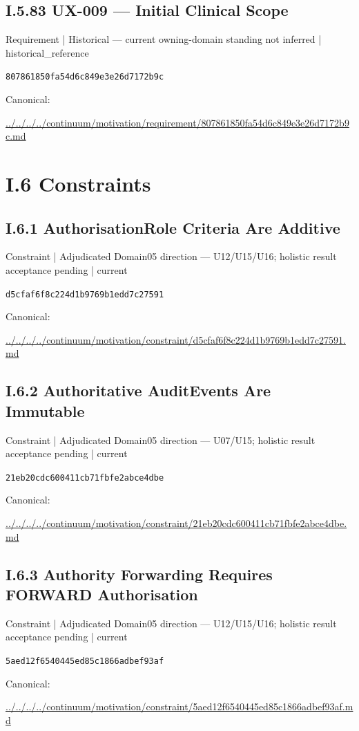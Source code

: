 \documentclass[10pt,a4paper]{article}
\begin{document}
\subsection*{I.5.83 UX-009 — Initial Clinical Scope}
{\small Requirement | Historical — current owning-domain standing not inferred | historical\_reference}\par
\texttt{807861850fa54d6c849e3e26d7172b9c}\par
Canonical: \par
{\footnotesize\url{../../../../continuum/motivation/requirement/807861850fa54d6c849e3e26d7172b9c.md}}\par
\section*{I.6 Constraints}
\subsection*{I.6.1 AuthorisationRole Criteria Are Additive}
{\small Constraint | Adjudicated Domain05 direction — U12/U15/U16; holistic result acceptance pending | current}\par
\texttt{d5cfaf6f8c224d1b9769b1edd7c27591}\par
Canonical: \par
{\footnotesize\url{../../../../continuum/motivation/constraint/d5cfaf6f8c224d1b9769b1edd7c27591.md}}\par
\subsection*{I.6.2 Authoritative AuditEvents Are Immutable}
{\small Constraint | Adjudicated Domain05 direction — U07/U15; holistic result acceptance pending | current}\par
\texttt{21eb20cdc600411cb71fbfe2abce4dbe}\par
Canonical: \par
{\footnotesize\url{../../../../continuum/motivation/constraint/21eb20cdc600411cb71fbfe2abce4dbe.md}}\par
\subsection*{I.6.3 Authority Forwarding Requires FORWARD Authorisation}
{\small Constraint | Adjudicated Domain05 direction — U12/U15/U16; holistic result acceptance pending | current}\par
\texttt{5aed12f6540445ed85c1866adbef93af}\par
Canonical: \par
{\footnotesize\url{../../../../continuum/motivation/constraint/5aed12f6540445ed85c1866adbef93af.md}}\par
\end{document}

